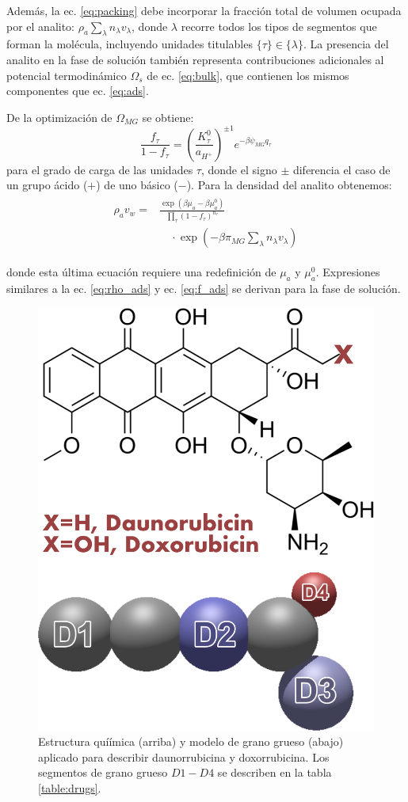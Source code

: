 Adem\'as, la ec. \ref{eq:packing} debe incorporar la fracci\'on total de volumen ocupada por el analito: $\rho_a \sum_\lambda n_\lambda v_\lambda$, donde $\lambda$ recorre todos los tipos de segmentos que forman la mol\'ecula, incluyendo unidades titulables $\{\tau\}\in\{\lambda\}$.
La presencia del analito en la fase de soluci\'on tambi\'en representa contribuciones adicionales al potencial termodin\'amico $\Omega_s$ de ec. \ref{eq:bulk}, que contienen los mismos componentes que ec. \ref{eq:ads}.

De la optimizaci\'on de  $\Omega_{MG}$  se obtiene:
%
\begin{equation}
\frac{f_\tau}{1-f_\tau}=\left(\frac{K^0_\tau}{a_{H^+}}\right)^{\pm 1} e^{-\beta \psi_{MG} q_\tau}
\label{eq:f_ads}
\end{equation}
%
\noindent para el grado de carga de las unidades $\tau$, donde el signo $\pm$ diferencia el caso de un grupo \'acido ($+$) de uno b\'asico ($-$).
Para la densidad del analito obtenemos:
%
\begin{align}
    \begin{aligned}
   \rho_a v_w =&\frac{ \exp{\left(\beta \mu_a - \beta \mu^0_a \right)}}{\prod_\tau \left(1-f_\tau\right)^{n_\tau}}\\
&\quad \cdot\exp{\left(-\beta \pi_{MG} \sum_\lambda n_\lambda v_\lambda \right)} 
    \end{aligned}\label{eq:rho_ads}
\end{align}
%

\noindent donde esta \'ultima ecuaci\'on requiere una redefinici\'on de $\mu_a$ y $\mu_a^0$.
Expresiones similares a la ec. \ref{eq:rho_ads} y ec. \ref{eq:f_ads} se derivan para la fase de soluci\'on.



\begin{figure}[!tb]
\centering
\includegraphics[width=0.35\linewidth]{Figures/graph-gel/dauno-doxo.png}
\caption{Estructura quí\'imica (arriba) y modelo de grano grueso (abajo) aplicado para describir daunorrubicina y doxorrubicina.
	Los segmentos de grano grueso $D1-D4$ se describen en la tabla \ref{table:drugs}.}
\label{fig:dauno-doxo}
\end{figure}


